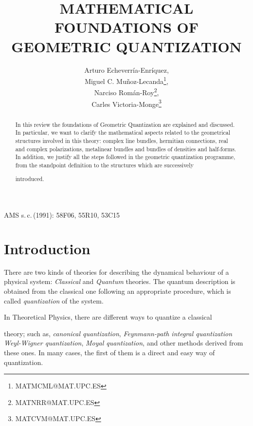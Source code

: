 \documentclass[12pt]{article}
\title{MATHEMATICAL FOUNDATIONS OF GEOMETRIC QUANTIZATION}
\author{\sc Arturo Echeverr\'ia-Enr\'iquez,
   \\
   {\sc Miguel C. Mu\~noz-Lecanda\thanks{MATMCML@MAT.UPC.ES}},
   \\
   {\sc Narciso Rom\'an-Roy\thanks{MATNRR@MAT.UPC.ES}},
   \\
   {\sc Carles Victoria-Monge\thanks{MATCVM@MAT.UPC.ES}}
   \\
   \tabaddress{\UPCMAT}}
\date{ }
\begin{document}
\maketitle


\begin{abstract}
In this review
the foundations of Geometric Quantization are explained and discussed.
In particular, we want to clarify the mathematical aspects related to
the
geometrical structures involved in this theory: complex line bundles,
hermitian connections, real and complex polarizations, metalinear
bundles and
bundles of densities and half-forms.
In addition, we justify all the steps followed in the geometric
quantization programme,
 from the standpoint definition to the structures which are successively

introduced.
\end{abstract}


\vfill \hfill
\vbox{\raggedleft AMS s.\,c.\,(1991): 58F06, 55R10, 53C15}\null

\thispagestyle{empty}
\setcounter{page}{0}


\clearpage
\tableofcontents


\newpage

\section{Introduction}


There are two kinds of theories for describing
the dynamical behaviour of a physical system:
{\it Classical} and {\it Quantum} theories.
The quantum description is obtained from the classical one
following an appropriate procedure, which is called {\it quantization}
of the system.

In Theoretical Physics, there are different ways to quantize a classical

theory;
such as,  {\it canonical quantization}, {\it Feynmann-path integral
quantization}
{\it Weyl-Wigner quantization}, {\it Moyal quantization},
and other methods derived from these ones.
In many cases, the first of them is a direct and easy way of
quantization.
\end{document}
